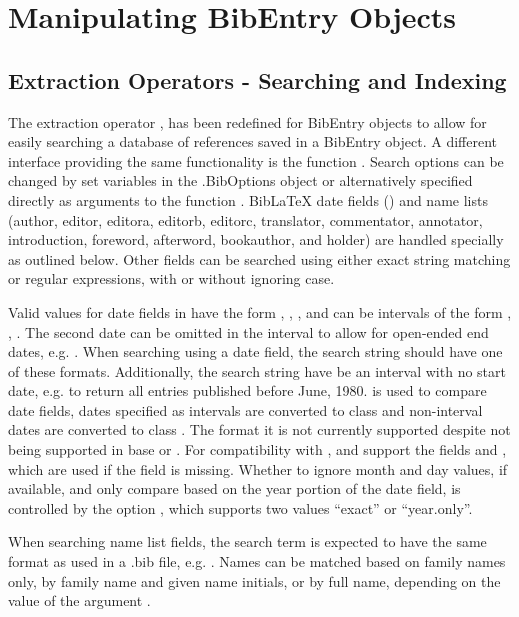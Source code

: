 \documentclass[article]{jss}\usepackage[]{graphicx}\usepackage[]{color}
\newcommand{\ourpkg}{\pkg{RefManageR}}
\begin{document}
\section{Manipulating BibEntry Objects}
\subsection{Extraction Operators - Searching and Indexing}
The extraction operator \code{'['}, has been redefined for BibEntry objects to allow for easily searching a database of references saved in a BibEntry object.  A different interface providing the same functionality is the function .  Search options can be changed by set variables in the .BibOptions object or alternatively specified directly as arguments to the function .  BibLaTeX date fields () and name lists (author, editor, editora, editorb, editorc, translator, commentator, annotator, introduction, foreword, afterword, bookauthor, and holder) are handled specially as outlined below.  Other fields can be searched using either exact string matching or regular expressions, with or without ignoring case.

Valid values for date fields in \Biblatex{} have the form , , , and can be intervals of the form , , .  The second date can be omitted in the interval to allow for open-ended end dates, e.g. .  When searching using a date field, the search string should have one of these formats.  Additionally, the search string have be an interval with no start date, e.g.  to return all entries published before June, 1980.   \citep{lubridate} is used to compare date fields, dates specified as intervals are converted to class  and non-interval dates are converted to class .  The format  it is not currently supported despite not being supported in base \R{} or .  For compatibility with \Bibtex{}, \Biblatex{} and \ourpkg{} support the fields  and , which are used if the  field is missing. Whether to ignore month and day values, if available, and only compare based on the year portion of the date field, is controlled by the option , which supports two values ``exact'' or ``year.only''.

When searching name list fields, the search term is expected to have the same format as used in a .bib file, e.g. .  Names can be matched based on family names only, by family name and given name initials, or by full name, depending on the value of the argument .  
\end{document}
